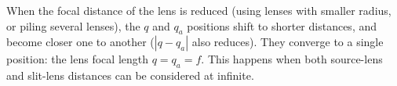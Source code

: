 \documentclass[9pt,twocolumn,twoside]{osajnl}
\begin{document}
When the focal distance of the lens is reduced (using lenses with smaller radius, or piling several lenses), the $q$ and $q_a$ positions shift to shorter distances, and become closer one to another ($|q-q_a|$ also reduces). They converge to a single position: the lens focal length $q=q_a=f$. This happens when both source-lens and slit-lens distances can be considered at infinite. 

\end{document}
